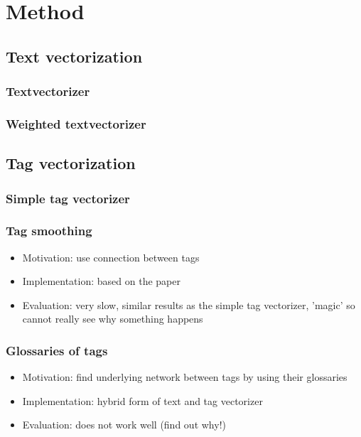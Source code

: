 \section{Method}

\subsection{Text vectorization}
\subsubsection{Textvectorizer}


\subsubsection{Weighted textvectorizer}


\subsection{Tag vectorization}
\subsubsection{Simple tag vectorizer}
%

\subsubsection{Tag smoothing}
\begin{itemize}
\item Motivation: use connection between tags
\item Implementation: based on the paper
\item Evaluation: very slow, similar results as the simple tag vectorizer, 'magic' so cannot really see why something happens
\end{itemize}

\subsubsection{Glossaries of tags}
\begin{itemize}
\item Motivation: find underlying network between tags by using their glossaries
\item Implementation: hybrid form of text and tag vectorizer
\item Evaluation: does not work well (find out why!) 
\end{itemize}

